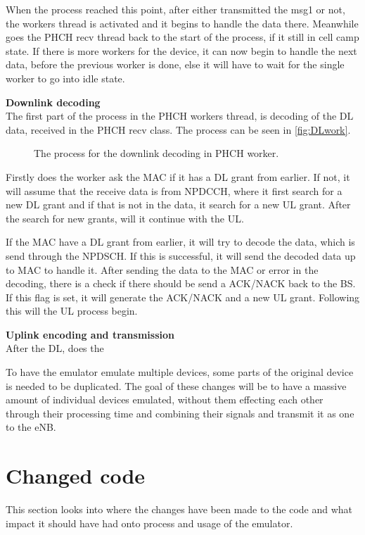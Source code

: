 When the process reached this point, after either transmitted the msg1 or not, the workers thread is activated and it begins to handle the data there. Meanwhile goes the PHCH recv thread back to the start of the process, if it still in cell camp state. If there is more workers for the device, it can now begin to handle the next data, before the previous worker is done, else it will have to wait for the single worker to go into idle state.

\textbf{Downlink decoding} \\
The first part of the process in the PHCH workers thread, is decoding of the DL data, received in the PHCH recv class. The process can be seen in \autoref{fig:DLwork}.

\begin{figure}[H]
\centering
{}
\resizebox{0.8\textwidth}{!}{
}
\caption{The process for the downlink decoding in PHCH worker.}
\label{fig:DLwork}
\end{figure}

Firstly does the worker ask the MAC if it has a DL grant from earlier. If not, it will assume that the receive data is from NPDCCH, where it first search for a new DL grant and if that is not in the data, it search for a new UL grant. After the search for new grants, will it continue with the UL.

If the MAC have a DL grant from earlier, it will try to decode the data, which is send through the NPDSCH. If this is successful, it will send the decoded data up to MAC to handle it. After sending the data to the MAC or error in the decoding, there is a check if there should be send a ACK/NACK back to the BS. If this flag is set, it will generate the ACK/NACK and a new UL grant. Following this will the UL process begin.

\textbf{Uplink encoding and transmission} \\
After the DL, does the









To have the emulator emulate multiple devices, some parts of the original device is needed to be duplicated. The goal of these changes will be to have a massive amount of individual devices emulated, without them effecting each other through their processing time and combining their signals and transmit it as one to the eNB.

\section{Changed code}
This section looks into where the changes have been made to the code and what impact it should have had onto process and usage of the emulator.


